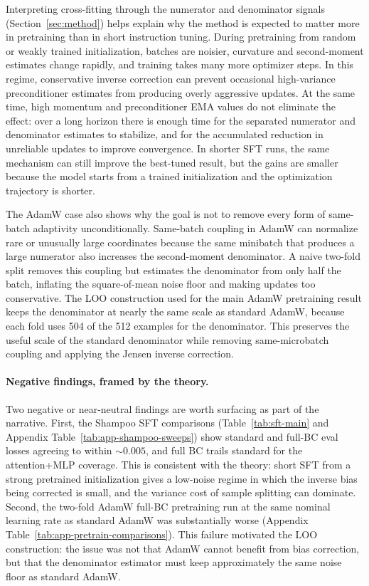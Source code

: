 \documentclass{article}
\begin{document}
Interpreting cross-fitting through the numerator and denominator signals (Section~\ref{sec:method}) helps explain why the method is expected to matter more in pretraining than in short instruction tuning. During pretraining from random or weakly trained initialization, batches are noisier, curvature and second-moment estimates change rapidly, and training takes many more optimizer steps. In this regime, conservative inverse correction can prevent occasional high-variance preconditioner estimates from producing overly aggressive updates. At the same time, high momentum and preconditioner EMA values do not eliminate the effect: over a long horizon there is enough time for the separated numerator and denominator estimates to stabilize, and for the accumulated reduction in unreliable updates to improve convergence. In shorter SFT runs, the same mechanism can still improve the best-tuned result, but the gains are smaller because the model starts from a trained initialization and the optimization trajectory is shorter.

The AdamW case also shows why the goal is not to remove every form of same-batch adaptivity unconditionally. Same-batch coupling in AdamW can normalize rare or unusually large coordinates because the same minibatch that produces a large numerator also increases the second-moment denominator. A naive two-fold split removes this coupling but estimates the denominator from only half the batch, inflating the square-of-mean noise floor and making updates too conservative. The LOO construction used for the main AdamW pretraining result keeps the denominator at nearly the same scale as standard AdamW, because each fold uses 504 of the 512 examples for the denominator. This preserves the useful scale of the standard denominator while removing same-microbatch coupling and applying the Jensen inverse correction.

\paragraph{Negative findings, framed by the theory.}
Two negative or near-neutral findings are worth surfacing as part of the narrative. First, the Shampoo SFT comparisons (Table~\ref{tab:sft-main} and Appendix Table~\ref{tab:app-shampoo-sweeps}) show standard and full-BC eval losses agreeing to within $\sim 0.005$, and full BC trails standard for the attention+MLP coverage. This is consistent with the theory: short SFT from a strong pretrained initialization gives a low-noise regime in which the inverse bias being corrected is small, and the variance cost of sample splitting can dominate. Second, the two-fold AdamW full-BC pretraining run at the same nominal learning rate as standard AdamW was substantially worse (Appendix Table~\ref{tab:app-pretrain-comparisons}). This failure motivated the LOO construction: the issue was not that AdamW cannot benefit from bias correction, but that the denominator estimator must keep approximately the same noise floor as standard AdamW.
\end{document}
